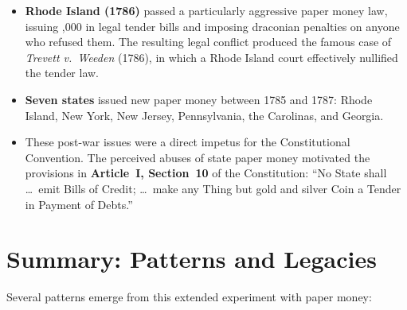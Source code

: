 \documentclass[12pt]{article}
\begin{document}
\begin{itemize}
    \item \textbf{Rhode Island (1786)} passed a particularly aggressive paper
    money law, issuing ,000 in legal tender bills and imposing
    draconian penalties on anyone who refused them.  The resulting legal
    conflict produced the famous case of \emph{Trevett v.\ Weeden} (1786),
    in which a Rhode Island court effectively nullified the tender law.

    \item \textbf{Seven states} issued new paper money between 1785 and 1787:
    Rhode Island, New York, New Jersey, Pennsylvania, the Carolinas, and
    Georgia.

    \item These post-war issues were a direct impetus for the Constitutional
    Convention.  The perceived abuses of state paper money motivated the
    provisions in \textbf{Article~I, Section~10} of the Constitution:
    ``No State shall \ldots\ emit Bills of Credit; \ldots\ make any Thing but
    gold and silver Coin a Tender in Payment of Debts.''
\end{itemize}

\section{Summary: Patterns and Legacies}

Several patterns emerge from this extended experiment with paper money:
\end{document}
